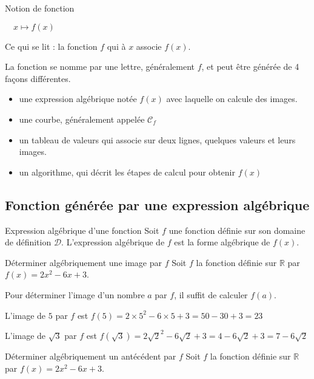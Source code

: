 \begin{pageCours}
\begin{DefT}{Notion de fonction}
\begin{minipage}{0.48\linewidth}
$\quad x \mapsto f(x)$

Ce qui se lit : la fonction $f$ qui à $x$ associe $f(x)$.


\end{minipage}
\end{DefT}

\begin{Rqs}
La fonction se nomme par une lettre, généralement $f$, et peut être générée de 4 façons différentes.
\begin{itemize}
\item une expression algébrique notée $f(x)$ avec laquelle on calcule des images.
 \item une courbe, généralement appelée $\mathcal C_{f}$
\item un tableau de valeurs qui associe sur deux lignes, quelques valeurs et leurs images.
\item un algorithme, qui décrit les étapes de calcul pour obtenir $f(x)$
 \end{itemize}
 
\end{Rqs}
 
 
\subsection{Fonction générée par une expression algébrique}
 
\begin{DefT}{Expression algébrique d'une fonction}
Soit $f$ une fonction définie sur son domaine de définition $\mathcal D$.
L'expression algébrique de $f$ est la forme algébrique de $f(x)$.
\end{DefT}
 

\begin{MtT}{Déterminer algébriquement une image  par $f$}
Soit $f$ la fonction définie sur $\mathbb R$ par $f(x)= 2x^2 - 6x + 3$.

Pour déterminer l'image d'un nombre $a$ par $f$, il suffit de calculer $f(a)$.

L'image de $5$ par $f$ est $f(5)= 2\times 5^2 - 6\times 5 + 3 = 50-30+3 = 23$

L'image de $\sqrt{3}$ par $f$ est $f(\sqrt{3})= 2  \sqrt{2}^2 - 6  \sqrt{2} + 3 = 4-6\sqrt{2}+3 = 7-6\sqrt{2}$
\end{MtT}



\begin{MtT}{Déterminer algébriquement un antécédent par $f$}
Soit $f$ la fonction définie sur $\mathbb R$ par $f(x)= 2x^2 - 6x + 3$.


\end{MtT}
\end{pageCours}
